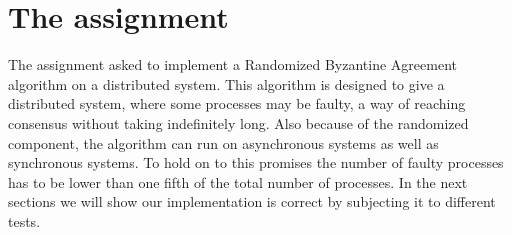 \section{The assignment}

The assignment asked to implement a Randomized Byzantine Agreement algorithm on a distributed system.
This algorithm is designed to give a distributed system, where some processes may be faulty, a way of reaching consensus without taking indefinitely long.
Also because of the randomized component, the algorithm can run on asynchronous systems as well as synchronous systems.
To hold on to this promises the number of faulty processes has to be lower than one fifth of the total number of processes. 
In the next sections we will show our implementation is correct by subjecting it to different tests.
